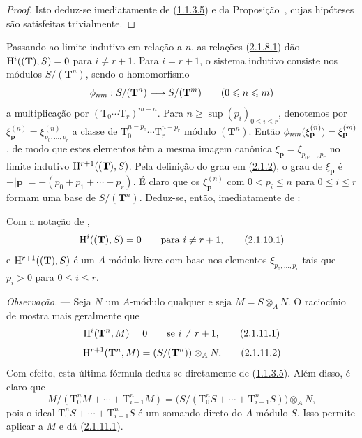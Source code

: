 \begin{proof}
Isto deduz-se imediatamente de (\hyperref[III.1.1.3.5]{1.1.3.5}) e da Proposição~, cujas hipóteses são satisfeitas trivialmente.
\end{proof}

\begin{env}[2.1.9]
\label{III.2.1.9}
Passando ao limite indutivo em relação a $n$, as relações (\hyperref[III.2.1.8.1]{2.1.8.1}) dão $\mathrm{H}^i((\mathbf{T}),S)=0$ para $i\neq r+1$.
Para $i=r+1$, o sistema indutivo consiste nos módulos $S/(\mathbf{T}^n)$, sendo o homomorfismo
\[
  \phi_{nm}:S/(\mathbf{T}^n)\longrightarrow S/(\mathbf{T}^m)
  \qquad (0\leqslant n\leqslant m)
\]
a multiplicação por $(\mathrm{T}_0\cdots\mathrm{T}_r)^{m-n}$.
Para $n\geq\sup(p_i)_{0\leq i\leq r}$, denotemos por $\xi_{\mathbf{p}}^{(n)}=\xi_{p_0,\dots,p_r}^{(n)}$ a classe de $\mathrm{T}_0^{n-p_0}\cdots\mathrm{T}_r^{n-p_r}$ módulo $(\mathbf{T}^n)$.
Então $\phi_{nm}(\xi_{\mathbf{p}}^{(n)})=\xi_{\mathbf{p}}^{(m)}$, de modo que estes elementos têm a mesma imagem canônica $\xi_{\mathbf{p}}=\xi_{p_0,\dots,p_r}$ no limite indutivo $\mathrm{H}^{r+1}((\mathbf{T}),S)$.
Pela definição do grau em (\hyperref[III.2.1.2]{2.1.2}), o grau de $\xi_{\mathbf{p}}$ é $-|\mathbf{p}|=-(p_0+p_1+\cdots+p_r)$.
É claro que os $\xi_{\mathbf{p}}^{(n)}$ com $0<p_i\leq n$ para $0\leq i\leq r$ formam uma base de $S/(\mathbf{T}^n)$.
Deduz-se, então, imediatamente de :
\end{env}

\begin{corollary}[2.1.10]
\label{III.2.1.10}
Com a notação de ,
\[
\label{III.2.1.10.1}
  \HH^i((\mathbf{T}),S)=0
  \qquad\text{para }i\neq r+1,
  \tag{2.1.10.1}
\]
e $\mathrm{H}^{r+1}((\mathbf{T}),S)$ é um $A$-módulo livre com base nos elementos $\xi_{p_0,\dots,p_r}$ tais que $p_i>0$ para $0\leq i\leq r$.
\end{corollary}

\begin{env}[2.1.11]
\label{III.2.1.11}
\emph{Observação.} ---
Seja $N$ um $A$-módulo qualquer e seja $M=S\otimes_A N$.
O raciocínio de  mostra mais geralmente que
\[
\label{III.2.1.11.1}
  \HH^i(\mathbf{T}^n,M)=0
  \qquad\text{se }i\neq r+1,
  \tag{2.1.11.1}
\]
\[
\label{III.2.1.11.2}
  \HH^{r+1}(\mathbf{T}^n,M)=(S/(\mathbf{T}^n))\otimes_A N.
  \tag{2.1.11.2}
\]
Com efeito, esta última fórmula deduz-se diretamente de (\hyperref[III.1.1.3.5]{1.1.3.5}).
Além disso, é claro que
\[
  M/(\mathrm{T}_0^nM+\cdots+\mathrm{T}_{i-1}^nM)
  =\bigl(S/(\mathrm{T}_0^nS+\cdots+\mathrm{T}_{i-1}^nS)\bigr)\otimes_A N,
\]
pois o ideal $\mathrm{T}_0^nS+\cdots+\mathrm{T}_{i-1}^nS$ é um somando direto do $A$-módulo $S$.
Isso permite aplicar  a $M$ e dá (\hyperref[III.2.1.11.1]{2.1.11.1}).
\end{env}

